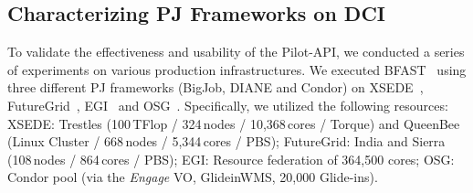 \documentclass[conference]{IEEEtran}
\begin{document}
%
%

\subsection{Characterizing PJ Frameworks on DCI}
\label{sec:fg-xsede-osg-egi}



To validate the effectiveness and usability of the Pilot-API, we
conducted a series of experiments on various production
infrastructures. We executed BFAST~\cite{bfast2009} using three
different PJ frameworks (BigJob, DIANE and Condor) on
XSEDE~\cite{xsede}, FutureGrid~\cite{fg}, EGI~\cite{egi} and
OSG~\cite{1742-6596-78-1-012057}.  Specifically, we utilized the
following resources: XSEDE: Trestles (100\,TFlop / 324\,nodes /
10,368\,cores / Torque) and QueenBee (Linux Cluster / 668\,nodes /
5,344\,cores / PBS); FutureGrid: India and Sierra (108\,nodes /
864\,cores / PBS);
EGI: Resource federation of 364,500 cores;
OSG: Condor pool (via the \textit{Engage} VO, GlideinWMS, 20,000
Glide-ins).

\end{document}
